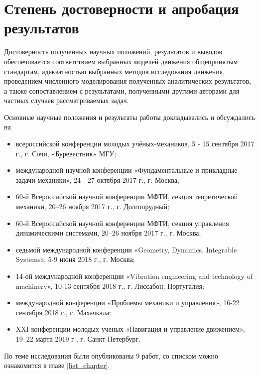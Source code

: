\section{Степень достоверности и апробация результатов}
Достоверность полученных научных положений, результатов и выводов обеспечивается
соответствием выбранных моделей движения общепринятым стандартам,
адекватностью выбранных методов исследования движения,
проведением численного моделирования полученных аналитических результатов,
а также сопоставлением с результатами,
полученными другими авторами для частных случаев рассматриваемых задач.

Основные научные положения и результаты работы докладывались и обсуждались на 
\begin{itemize}
\item всероссийской конференции молодых учёных-механиков, 5 - 15 сентября 2017 г., г. Сочи, «Буревестник» МГУ;
\item международной научной конференции «Фундаментальные и прикладные задачи механики», 24 - 27 октября 2017 г., г. Москва;
\item 60-й Всероссийской научной конференции МФТИ, cекция теоретической механики, 20–26 ноября 2017 г., г. Долгопрудный;
\item 60-й Всероссийской научной конференции МФТИ, секция управления динамическими системами, 20–26 ноября 2017 г., г. Москва;
\item седьмой международной конференции «Geometry, Dynamics, Integrable Systems», 5-9 июня 2018 г., г. Москва;
\item 14-ой международной конференции «Vibration engineering and technology of machinery», 10-13 сентября 2018 г., г. Лиссабон, Португалия;
\item международной конференции «Проблемы механики и управления», 16-22 сентября 2018 г., г. Махачкала;
\item XXI конференции молодых ученых «Навигация и управление движением», 19–22 марта 2019 г., г. Санкт-Петербург.
\end{itemize}
По теме исследования были опубликованы 9 работ, со списком можно ознакомится в главе \ref{list_chapter}.

